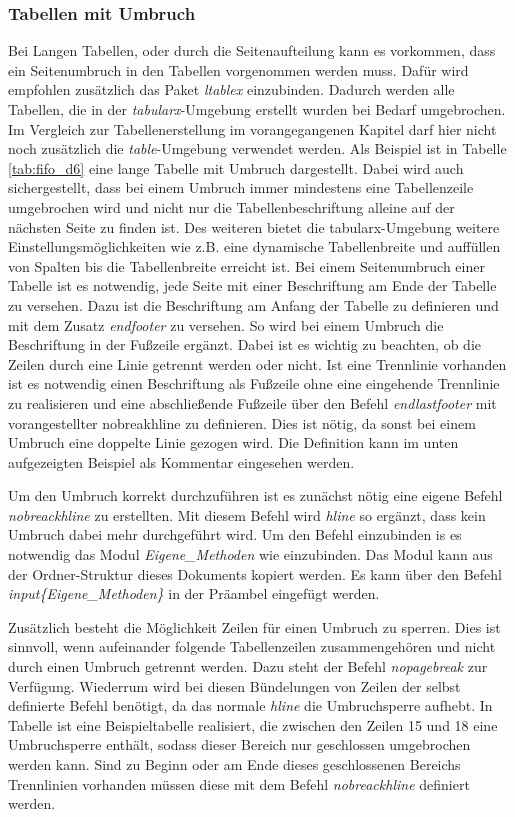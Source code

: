 \documentclass[13pt,a4paper, listof=entryprefix, bibliography=totocnumbered,toc=listofnumbered,lof=listofnumbered]{scrartcl}
\begin{document}
\subsubsection{Tabellen mit Umbruch}
Bei Langen Tabellen, oder durch die Seitenaufteilung kann es vorkommen, dass ein Seitenumbruch in den Tabellen vorgenommen werden muss. Dafür wird empfohlen zusätzlich das Paket \textit{ltablex} einzubinden. Dadurch werden alle Tabellen, die in der \textit{tabularx}-Umgebung erstellt wurden bei Bedarf umgebrochen. Im Vergleich zur Tabellenerstellung im vorangegangenen Kapitel darf hier nicht noch zusätzlich die \textit{table}-Umgebung verwendet werden. Als Beispiel ist in Tabelle \ref{tab:fifo_d6} eine lange Tabelle mit Umbruch dargestellt. Dabei wird auch sichergestellt, dass bei einem Umbruch immer mindestens eine Tabellenzeile umgebrochen wird und nicht nur die Tabellenbeschriftung alleine auf der nächsten Seite zu finden ist. Des weiteren bietet die  tabularx-Umgebung weitere Einstellungsmöglichkeiten wie z.B. eine dynamische Tabellenbreite und auffüllen von Spalten bis die Tabellenbreite erreicht ist. Bei einem Seitenumbruch einer Tabelle ist es notwendig, jede Seite mit einer Beschriftung am Ende der Tabelle zu versehen. Dazu ist die Beschriftung am Anfang der Tabelle zu definieren und mit dem Zusatz \textit{endfooter} zu versehen. So wird bei einem Umbruch die Beschriftung in der Fußzeile ergänzt. Dabei ist es wichtig zu beachten, ob die Zeilen durch eine Linie getrennt werden oder nicht. Ist eine Trennlinie vorhanden ist es notwendig einen Beschriftung als Fußzeile ohne eine eingehende Trennlinie zu realisieren und eine abschließende Fußzeile über den Befehl \textit{endlastfooter} mit vorangestellter nobreakhline zu definieren. Dies ist nötig, da sonst bei einem Umbruch eine doppelte Linie gezogen wird. Die Definition kann im unten aufgezeigten Beispiel als Kommentar eingesehen werden.

Um den Umbruch korrekt durchzuführen ist es zunächst nötig eine eigene Befehl \textit{nobreackhline} zu erstellten. Mit diesem Befehl wird \textit{hline} so ergänzt, dass kein Umbruch dabei mehr durchgeführt wird. Um den Befehl einzubinden is es notwendig das Modul \textit{Eigene\_Methoden} wie einzubinden. Das Modul kann aus der Ordner-Struktur dieses Dokuments kopiert werden. Es kann über den Befehl \textit{input\{Eigene\_Methoden\}} in der Präambel eingefügt werden.

Zusätzlich besteht die Möglichkeit Zeilen für einen Umbruch zu sperren. Dies ist sinnvoll, wenn aufeinander folgende Tabellenzeilen zusammengehören und nicht durch einen Umbruch getrennt werden. Dazu steht der Befehl \textit{nopagebreak} zur Verfügung. Wiederrum wird bei diesen Bündelungen von Zeilen der selbst definierte Befehl benötigt, da das normale \textit{hline} die Umbruchsperre aufhebt. In Tabelle ist eine Beispieltabelle realisiert, die zwischen den Zeilen 15 und 18 eine Umbruchsperre enthält, sodass dieser Bereich nur geschlossen umgebrochen werden kann. Sind zu Beginn oder am Ende dieses geschlossenen Bereichs Trennlinien vorhanden müssen diese mit dem Befehl \textit{nobreackhline} definiert werden.
\end{document}
